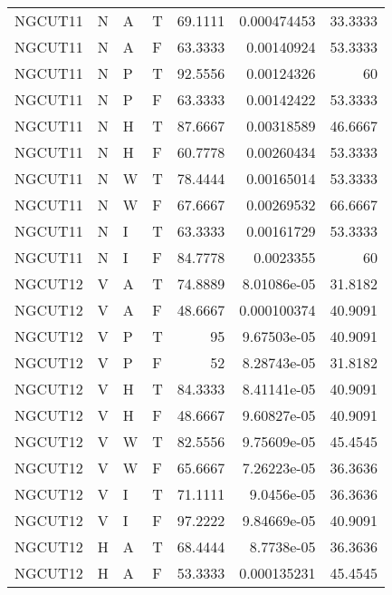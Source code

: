 \begin{longtable}{llllrrr}
    NGCUT11  & N     & A     & T          & 69.1111    & 0.000474453 & 33.3333  \\
    NGCUT11  & N     & A     & F          & 63.3333    & 0.00140924  & 53.3333  \\
    NGCUT11  & N     & P     & T          & 92.5556    & 0.00124326  & 60       \\
    NGCUT11  & N     & P     & F          & 63.3333    & 0.00142422  & 53.3333  \\
    NGCUT11  & N     & H     & T          & 87.6667    & 0.00318589  & 46.6667  \\
    NGCUT11  & N     & H     & F          & 60.7778    & 0.00260434  & 53.3333  \\
    NGCUT11  & N     & W     & T          & 78.4444    & 0.00165014  & 53.3333  \\
    NGCUT11  & N     & W     & F          & 67.6667    & 0.00269532  & 66.6667  \\
    NGCUT11  & N     & I     & T          & 63.3333    & 0.00161729  & 53.3333  \\
    NGCUT11  & N     & I     & F          & 84.7778    & 0.0023355   & 60       \\
    NGCUT12  & V     & A     & T          & 74.8889    & 8.01086e-05 & 31.8182  \\
    NGCUT12  & V     & A     & F          & 48.6667    & 0.000100374 & 40.9091  \\
    NGCUT12  & V     & P     & T          & 95         & 9.67503e-05 & 40.9091  \\
    NGCUT12  & V     & P     & F          & 52         & 8.28743e-05 & 31.8182  \\
    NGCUT12  & V     & H     & T          & 84.3333    & 8.41141e-05 & 40.9091  \\
    NGCUT12  & V     & H     & F          & 48.6667    & 9.60827e-05 & 40.9091  \\
    NGCUT12  & V     & W     & T          & 82.5556    & 9.75609e-05 & 45.4545  \\
    NGCUT12  & V     & W     & F          & 65.6667    & 7.26223e-05 & 36.3636  \\
    NGCUT12  & V     & I     & T          & 71.1111    & 9.0456e-05  & 36.3636  \\
    NGCUT12  & V     & I     & F          & 97.2222    & 9.84669e-05 & 40.9091  \\
    NGCUT12  & H     & A     & T          & 68.4444    & 8.7738e-05  & 36.3636  \\
    NGCUT12  & H     & A     & F          & 53.3333    & 0.000135231 & 45.4545  \\

\end{longtable}

